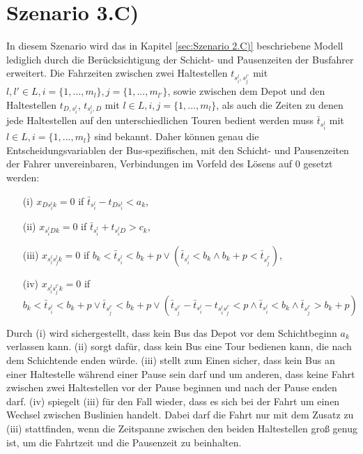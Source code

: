 \section{Szenario 3.C)}
\label{sec:4.5}
\label{sec:Szenario 3.C)}
In diesem Szenario wird das in Kapitel \ref{sec:Szenario 2.C)} beschriebene Modell lediglich durch die Berücksichtigung der Schicht- und Pausenzeiten der Busfahrer erweitert. Die Fahrzeiten zwischen zwei Haltestellen $t_{s_i^l,s_j^{l'}}$ mit $l,l' \in L, i = \{1,...,m_l\}, j =\{1,...,m_{l'}\}$, sowie zwischen dem Depot und den Haltestellen $t_{D,s_i^l}$, $t_{s_i^l,D}$ mit $l \in L, i,j = \{1,...,m_l\}$, als auch die Zeiten zu denen jede Haltestellen auf den unterschiedlichen Touren bedient werden muss $\bar{t}_{s_i^l}$ mit $l \in L, i = \{1,...,m_l\}$ sind bekannt. Daher können genau die Entscheidungsvariablen der Bus-spezifischen, mit den Schicht- und Pausenzeiten der Fahrer unvereinbaren, Verbindungen im Vorfeld des Lösens auf 0 gesetzt werden:
\begin{itemize}
    \item[(i)] $x_{D s_i^l k} = 0$ \quad if \quad $\bar{t}_{s_i^l} - t_{D s_i^l} < a_k$,
    
    \item[(ii)] $x_{s_i^l D k} = 0$ \quad if \quad $\bar{t}_{s_i^l} + t_{s_i^l D} > c_k$,
    
    \item[(iii)] $x_{s_i^l s_j^l k} = 0$ \quad if \quad $b_k < \bar{t}_{s_i^l} < b_k + p \lor (\bar{t}_{s_i^l} < b_k \land b_k + p < \bar{t}_{s_j^{l'}})$,
    
    \item[(iv)] $x_{s_i^l s_j^{l'} k} = 0$ \quad if \quad $b_k < \bar{t}_{s_i^l} < b_k + p 
        \lor \bar{t}_{s_j^{l'}} < b_k + p 
        \lor (\bar{t}_{s_j^{l'}} - \bar{t}_{s_i^l} - t_{s_i^l s_j^{l'}} < p 
        \land \bar{t}_{s_i^l} < b_k 
        \land \bar{t}_{s_j^{l'}} > b_k + p)$
\end{itemize}

Durch (i) wird sichergestellt, dass kein Bus das Depot vor dem Schichtbeginn $a_k$ verlassen kann. (ii) sorgt dafür, dass kein Bus eine Tour bedienen kann, die nach dem Schichtende enden würde. (iii) stellt zum Einen sicher, dass kein Bus an einer Haltestelle während einer Pause sein darf und um anderen, dass keine Fahrt zwischen zwei Haltestellen vor der Pause beginnen und nach der Pause enden darf. (iv) spiegelt (iii) für den Fall wieder, dass es sich bei der Fahrt um einen Wechsel zwischen Buslinien handelt. Dabei darf die Fahrt nur mit dem Zusatz zu (iii) stattfinden, wenn die Zeitspanne zwischen den beiden Haltestellen groß genug ist, um die Fahrtzeit und die Pausenzeit zu beinhalten.



